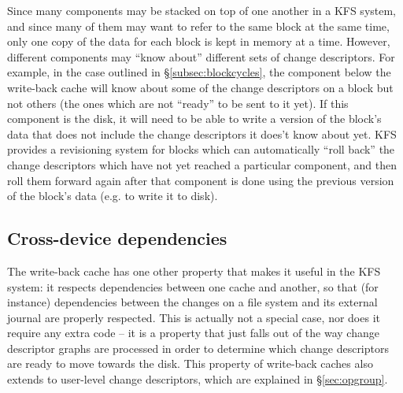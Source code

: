Since many components may be stacked on top of one another in a KFS system, and
since many of them may want to refer to the same block at the same time, only
one copy of the data for each block is kept in memory at a time. However,
different components may ``know about'' different sets of change descriptors.
For example, in the case outlined in \S\ref{subsec:blockcycles}, the component
below the write-back cache will know about some of the change descriptors on a
block but not others (the ones which are not ``ready'' to be sent to it yet). If
this component is the disk, it will need to be able to write a version of the
block's data that does not include the change descriptors it does't know about
yet. KFS provides a revisioning system for blocks which can automatically ``roll
back'' the change descriptors which have not yet reached a particular component,
and then roll them forward again after that component is done using the previous
version of the block's data (e.g. to write it to disk).

\subsection{Cross-device dependencies}

The write-back cache has one other property that makes it useful in the KFS
system: it respects dependencies between one cache and another, so that (for
instance) dependencies between the changes on a file system and its external
journal are properly respected. This is actually not a special case, nor does it
require any extra code -- it is a property that just falls out of the way change
descriptor graphs are processed in order to determine which change descriptors
are ready to move towards the disk. This property of write-back caches also
extends to user-level change descriptors, which are explained in
\S\ref{sec:opgroup}.

